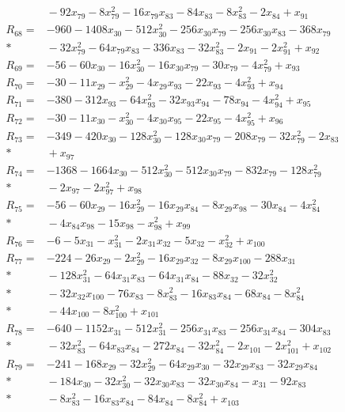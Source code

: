 \begin{align*}
&{}-92x_{79}-8x_{79}^{2}-16x_{79}x_{83}-84x_{83}-8x_{83}^{2}-2x_{84}+x_{91}\\[3pt]
R_{68}={}&-960-1408x_{30}-512x_{30}^{2}-256x_{30}x_{79}-256x_{30}x_{83}-368x_{79}\\*
&{}-32x_{79}^{2}-64x_{79}x_{83}-336x_{83}-32x_{83}^{2}-2x_{91}-2x_{91}^{2}+x_{92}\\[3pt]
R_{69}={}&-56-60x_{30}-16x_{30}^{2}-16x_{30}x_{79}-30x_{79}-4x_{79}^{2}+x_{93}\\[3pt]
R_{70}={}&-30-11x_{29}-x_{29}^{2}-4x_{29}x_{93}-22x_{93}-4x_{93}^{2}+x_{94}\\[3pt]
R_{71}={}&-380-312x_{93}-64x_{93}^{2}-32x_{93}x_{94}-78x_{94}-4x_{94}^{2}+x_{95}\\[3pt]
R_{72}={}&-30-11x_{30}-x_{30}^{2}-4x_{30}x_{95}-22x_{95}-4x_{95}^{2}+x_{96}\\[3pt]
R_{73}={}&-349-420x_{30}-128x_{30}^{2}-128x_{30}x_{79}-208x_{79}-32x_{79}^{2}-2x_{83}\\*
&{}+x_{97}\\[3pt]
R_{74}={}&-1368-1664x_{30}-512x_{30}^{2}-512x_{30}x_{79}-832x_{79}-128x_{79}^{2}\\*
&{}-2x_{97}-2x_{97}^{2}+x_{98}\\[3pt]
R_{75}={}&-56-60x_{29}-16x_{29}^{2}-16x_{29}x_{84}-8x_{29}x_{98}-30x_{84}-4x_{84}^{2}\\*
&{}-4x_{84}x_{98}-15x_{98}-x_{98}^{2}+x_{99}\\[3pt]
R_{76}={}&-6-5x_{31}-x_{31}^{2}-2x_{31}x_{32}-5x_{32}-x_{32}^{2}+x_{100}\\[3pt]
R_{77}={}&-224-26x_{29}-2x_{29}^{2}-16x_{29}x_{32}-8x_{29}x_{100}-288x_{31}\\*
&{}-128x_{31}^{2}-64x_{31}x_{83}-64x_{31}x_{84}-88x_{32}-32x_{32}^{2}\\*
&{}-32x_{32}x_{100}-76x_{83}-8x_{83}^{2}-16x_{83}x_{84}-68x_{84}-8x_{84}^{2}\\*
&{}-44x_{100}-8x_{100}^{2}+x_{101}\\[3pt]
R_{78}={}&-640-1152x_{31}-512x_{31}^{2}-256x_{31}x_{83}-256x_{31}x_{84}-304x_{83}\\*
&{}-32x_{83}^{2}-64x_{83}x_{84}-272x_{84}-32x_{84}^{2}-2x_{101}-2x_{101}^{2}+x_{102}\\[3pt]
R_{79}={}&-241-168x_{29}-32x_{29}^{2}-64x_{29}x_{30}-32x_{29}x_{83}-32x_{29}x_{84}\\*
&{}-184x_{30}-32x_{30}^{2}-32x_{30}x_{83}-32x_{30}x_{84}-x_{31}-92x_{83}\\*
&{}-8x_{83}^{2}-16x_{83}x_{84}-84x_{84}-8x_{84}^{2}+x_{103}\\[3pt]

\end{align*}
